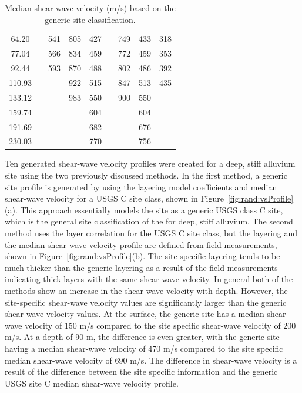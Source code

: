\documentclass[12pt,oneside]{book}
\begin{document}
\begin{table}[tbp]
\begin{tabular}{ccc|cccccc}
        64.20 &      & 541 & 805 & 427 &      & 749 & 433 & 318 \\
        77.04 &      & 566 & 834 & 459 &      & 772 & 459 & 353 \\
        92.44 &      & 593 & 870 & 488 &      & 802 & 486 & 392 \\
        110.93 &      &     & 922 & 515 &      & 847 & 513 & 435 \\
        133.12 &      &     & 983 & 550 &      & 900 & 550 &     \\
        159.74 &      &     &     & 604 &      &     & 604 &     \\
        191.69 &      &     &     & 682 &      &     & 676 &     \\
        230.03 &      &     &     & 770 &      &     & 756 &     \\
        \hline\hline
    \end{tabular}
    \caption{Median shear-wave velocity (m/s) based on the generic site classification.}
    \label{tab:rand:velocity}
\end{table}


Ten generated shear-wave velocity profiles were created for a deep, stiff alluvium site using
the two previously discussed methods.  In the first method, a generic site profile is generated by
using the layering model coefficients and median shear-wave velocity for a USGS C site class, shown
in Figure~\ref{fig:rand:vsProfile}(a).  This approach essentially models the site as a generic USGS
class C site, which is the general site classification of the for deep, stiff alluvium.  The second
method uses the layer correlation for the USGS C site class, but the layering and the median
shear-wave velocity profile are defined from field measurements, shown in
Figure~\ref{fig:rand:vsProfile}(b).  The site specific layering tends to be much thicker than the
generic layering as a result of the field measurements indicating thick layers with the same shear
wave velocity.  In general both of the methods show an increase in the shear-wave velocity with
depth.  However, the site-specific shear-wave velocity values are significantly larger than the
generic shear-wave velocity values.  At the surface, the generic site has a median shear-wave
velocity of 150 m/s compared to the site specific shear-wave velocity of 200 m/s. At a depth of 90
m, the difference is even greater, with the generic site having a median shear-wave velocity of 470
m/s compared to the site specific median shear-wave velocity of 690 m/s.  The difference in
shear-wave velocity is a result of the difference between the site specific information and the
generic USGS site C median shear-wave velocity profile.
\end{document}
